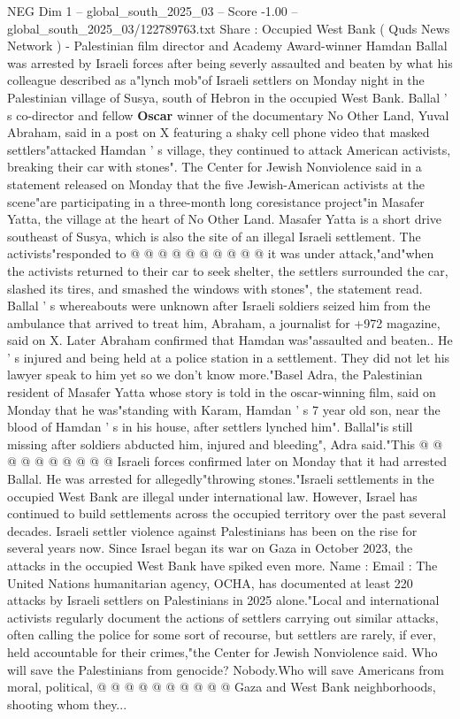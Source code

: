 \begin{textsample}{NEG Dim 1 – global\_south\_2025\_03 – Score -1.00 – global\_south\_2025\_03/122789763.txt}  \label{ex:f1_neg_160}
Share : Occupied West Bank ( Quds News Network ) - Palestinian film director and Academy Award-winner Hamdan Ballal was arrested by Israeli forces after being severly assaulted and beaten by what his colleague described as a"lynch mob"of Israeli settlers on Monday night in the Palestinian village of Susya, south of Hebron in the occupied West Bank.
Ballal ' s co-director and fellow \textbf{Oscar} winner of the documentary No Other Land, Yuval Abraham, said in a post on X featuring a shaky cell phone video that masked settlers"attacked Hamdan ' s village, they continued to attack American activists, breaking their car with stones".
The Center for Jewish Nonviolence said in a statement released on Monday that the five Jewish-American activists at the scene"are participating in a three-month long coresistance project"in Masafer Yatta, the village at the heart of No Other Land.
Masafer Yatta is a short drive southeast of Susya, which is also the site of an illegal Israeli settlement.
The activists"responded to @ @ @ @ @ @ @ @ @ @ it was under attack,"and"when the activists returned to their car to seek shelter, the settlers surrounded the car, slashed its tires, and smashed the windows with stones", the statement read.
Ballal ' s whereabouts were unknown after Israeli soldiers seized him from the ambulance that arrived to treat him, Abraham, a journalist for +972 magazine, said on X.
Later Abraham confirmed that Hamdan was"assaulted and beaten..
He ' s injured and being held at a police station in a settlement.
They did not let his lawyer speak to him yet so we don't know more."Basel Adra, the Palestinian resident of Masafer Yatta whose story is told in the oscar-winning film, said on Monday that he was"standing with Karam, Hamdan ' s 7 year old son, near the blood of Hamdan ' s in his house, after settlers lynched him".
Ballal"is still missing after soldiers abducted him, injured and bleeding", Adra said."This @ @ @ @ @ @ @ @ @ @ Israeli forces confirmed later on Monday that it had arrested Ballal.
He was arrested for allegedly"throwing stones."Israeli settlements in the occupied West Bank are illegal under international law.
However, Israel has continued to build settlements across the occupied territory over the past several decades.
Israeli settler violence against Palestinians has been on the rise for several years now.
Since Israel began its war on Gaza in October 2023, the attacks in the occupied West Bank have spiked even more.
Name : Email : The United Nations humanitarian agency, OCHA, has documented at least 220 attacks by Israeli settlers on Palestinians in 2025 alone."Local and international activists regularly document the actions of settlers carrying out similar attacks, often calling the police for some sort of recourse, but settlers are rarely, if ever, held accountable for their crimes,"the Center for Jewish Nonviolence said.
Who will save the Palestinians from genocide?
Nobody.Who will save Americans from moral, political, @ @ @ @ @ @ @ @ @ @ Gaza and West Bank neighborhoods, shooting whom they...

\end{textsample}
